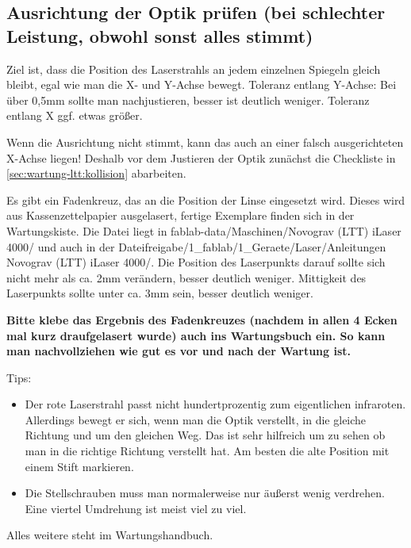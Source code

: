 \documentclass{\basedir/fablab-document}
\begin{document}
\subsection{Ausrichtung der Optik prüfen (bei schlechter Leistung, obwohl sonst alles stimmt)}\label{ltt-wartung-optik}
Ziel ist, dass die Position des Laserstrahls an jedem einzelnen Spiegeln gleich bleibt, egal wie man die X- und Y-Achse bewegt. Toleranz entlang Y-Achse: Bei über 0,5mm sollte man nachjustieren, besser ist deutlich weniger. Toleranz entlang X ggf. etwas größer.

Wenn die Ausrichtung nicht stimmt, kann das auch an einer falsch ausgerichteten X-Achse liegen! Deshalb vor dem Justieren der Optik zunächst die Checkliste in \cref{sec:wartung-ltt:kollision} abarbeiten.

Es gibt ein Fadenkreuz, das an die Position der Linse eingesetzt wird. Dieses wird aus Kassenzettelpapier ausgelasert, fertige Exemplare finden sich in der Wartungskiste. Die Datei liegt in fablab-data/Maschinen/Novograv (LTT) iLaser 4000/ und auch in der Dateifreigabe/1\_fablab/1\_Geraete/Laser/Anleitungen Novograv  (LTT) iLaser 4000/. Die Position des Laserpunkts darauf sollte sich nicht mehr als ca. 2mm verändern, besser deutlich weniger. Mittigkeit des Laserpunkts sollte unter ca. 3mm sein, besser deutlich weniger.

\textbf{Bitte klebe das Ergebnis des Fadenkreuzes (nachdem in allen 4 Ecken mal kurz draufgelasert wurde) auch ins Wartungsbuch ein. So kann man nachvollziehen wie gut es vor und nach der Wartung ist.}

Tips:
\begin{itemize}
	\item Der rote Laserstrahl passt nicht hundertprozentig zum eigentlichen infraroten. Allerdings bewegt er sich, wenn man die Optik verstellt, in die gleiche Richtung und um den gleichen Weg. Das ist sehr hilfreich um zu sehen ob man in die richtige Richtung verstellt hat. Am besten die alte Position mit einem Stift markieren.

	\item Die Stellschrauben muss man normalerweise nur äußerst wenig verdrehen. Eine viertel Umdrehung ist meist viel zu viel.
\end{itemize}

Alles weitere steht im Wartungshandbuch.
\end{document}
